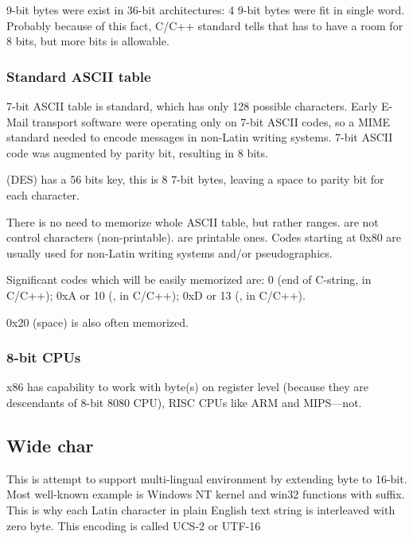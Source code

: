 9-bit bytes were exist in 36-bit architectures: 4 9-bit bytes were fit in single \gls{word}.
Probably because of this fact, C/C++ standard tells that  has to have a room for  8 bits, but more
bits is allowable.

\subsubsection{Standard ASCII table}

7-bit ASCII table is standard, which has only 128 possible characters.
Early E-Mail transport software were operating only on 7-bit ASCII codes, so a \ac{MIME} standard needed to encode messages
in non-Latin writing systems.
7-bit ASCII code was augmented by parity bit, resulting in 8 bits.

 (\ac{DES}) has a 56 bits key, this is 8 7-bit bytes,
leaving a space to parity bit for each character.

There is no need to memorize whole \ac{ASCII} table, but rather ranges.
 are not control characters (non-printable).
 are printable ones.
Codes starting at 0x80 are usually used for non-Latin writing systems and/or pseudographics.

Significant codes which will be easily memorized are:
0 (end of C-string,  in C/C++);
0xA or 10 (,  in C/C++);
0xD or 13 (,  in C/C++).

0x20 (space) is also often memorized.

\subsubsection{8-bit CPUs}

x86 has capability to work with byte(s) on register level (because they are descendants of 8-bit 8080 CPU),
RISC CPUs like ARM and MIPS---not.

\subsection{Wide char}

This is attempt to support multi-lingual environment by extending byte to 16-bit.
Most well-known example is Windows NT kernel and win32 functions with  suffix.
This is why each Latin character in plain English text string is interleaved with zero byte.
This encoding is called UCS-2 or UTF-16

